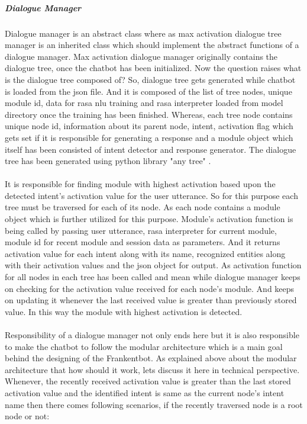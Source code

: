 \subparagraph*{Dialogue Manager}
Dialogue manager is an abstract class where as max activation dialogue tree manager is an inherited class which should implement the abstract functions of a dialogue manager. Max activation dialogue manager originally contains the dialogue tree, once the chatbot has been initialized. Now the question raises what is the dialogue tree composed of? So, dialogue tree gets generated while chatbot is loaded from the json file. And it is composed of the list of tree nodes, unique module id, data for rasa nlu training and rasa interpreter loaded from model directory once the training has been finished. Whereas, each tree node contains unique node id, information about its parent node,  intent, activation flag which gets set if it is responsible for generating a response and a module object which itself has been consisted of intent detector and response generator. The dialogue tree has been generated using python library "any tree" \cite{anytree}.
\\~\\
It is responsible for finding module with highest activation based upon the detected intent's activation value for the user utterance. So for this purpose each tree must be traversed for each of its node. As each node contains a module object which is further utilized for this purpose. Module's activation function is being called by passing user utterance, rasa interpreter for current module, module id for recent module and session data as parameters. And it returns activation value for each intent along with its name, recognized entities along with their activation values and the json object for output. As activation function for all nodes in each tree has been called and mean while dialogue manager keeps on checking for the activation value received for each node's module. And keeps on updating it whenever the last received value is greater than previously stored value. In this way the module with highest activation is detected.
\\~\\
Responsibility of a dialogue manager not only ends here but it is also responsible to make the chatbot to follow the modular architecture which is a main goal behind the designing of the Frankentbot. As explained above about the modular architecture that how should it work, lets discuss it here in technical perspective. Whenever, the recently received activation value is greater than the last stored activation value and the identified intent is same as the current node's intent name then there comes following scenarios, if the recently traversed node is a root node or not: 
